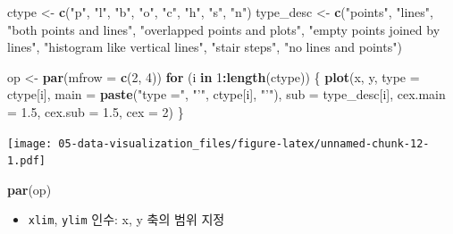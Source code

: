 \documentclass[
  11pt,
]{krantz}
\newenvironment{Shaded}{\begin{snugshade}}{\end{snugshade}}
\newcommand{\ControlFlowTok}[1]{\textcolor[rgb]{0.27,0.27,0.27}{\textbf{#1}}}
\newcommand{\DataTypeTok}[1]{\textcolor[rgb]{0.27,0.27,0.27}{#1}}
\newcommand{\DecValTok}[1]{\textcolor[rgb]{0.06,0.06,0.06}{#1}}
\newcommand{\FloatTok}[1]{\textcolor[rgb]{0.06,0.06,0.06}{#1}}
\newcommand{\KeywordTok}[1]{\textcolor[rgb]{0.27,0.27,0.27}{\textbf{#1}}}
\newcommand{\NormalTok}[1]{#1}
\newcommand{\OperatorTok}[1]{\textcolor[rgb]{0.43,0.43,0.43}{\textbf{#1}}}
\newcommand{\StringTok}[1]{\textcolor[rgb]{0.5,0.5,0.5}{#1}}
\providecommand{\tightlist}{%
  \setlength{\itemsep}{0pt}\setlength{\parskip}{0pt}}
\begin{document}
\begin{Shaded}
\begin{Highlighting}[]
\NormalTok{ctype <-}\StringTok{ }\KeywordTok{c}\NormalTok{(}\StringTok{"p"}\NormalTok{, }\StringTok{"l"}\NormalTok{, }\StringTok{"b"}\NormalTok{, }\StringTok{"o"}\NormalTok{, }\StringTok{"c"}\NormalTok{, }\StringTok{"h"}\NormalTok{, }\StringTok{"s"}\NormalTok{, }\StringTok{"n"}\NormalTok{)}
\NormalTok{type_desc <-}\StringTok{ }\KeywordTok{c}\NormalTok{(}\StringTok{"points"}\NormalTok{, }\StringTok{"lines"}\NormalTok{, }
               \StringTok{"both points and lines"}\NormalTok{, }
               \StringTok{"overlapped points and plots"}\NormalTok{, }
               \StringTok{"empty points joined by lines"}\NormalTok{, }
               \StringTok{"histogram like vertical lines"}\NormalTok{, }
               \StringTok{"stair steps"}\NormalTok{, }
               \StringTok{"no lines and points"}\NormalTok{)}

\NormalTok{op <-}\StringTok{ }\KeywordTok{par}\NormalTok{(}\DataTypeTok{mfrow =} \KeywordTok{c}\NormalTok{(}\DecValTok{2}\NormalTok{, }\DecValTok{4}\NormalTok{))}
\ControlFlowTok{for}\NormalTok{ (i }\ControlFlowTok{in} \DecValTok{1}\OperatorTok{:}\KeywordTok{length}\NormalTok{(ctype)) \{}
  \KeywordTok{plot}\NormalTok{(x, y, }
       \DataTypeTok{type =}\NormalTok{ ctype[i], }
       \DataTypeTok{main =} \KeywordTok{paste}\NormalTok{(}\StringTok{"type ="}\NormalTok{, }\StringTok{"'"}\NormalTok{, ctype[i], }\StringTok{"'"}\NormalTok{),}
       \DataTypeTok{sub =}\NormalTok{ type_desc[i], }
       \DataTypeTok{cex.main =} \FloatTok{1.5}\NormalTok{, }
       \DataTypeTok{cex.sub =} \FloatTok{1.5}\NormalTok{, }
       \DataTypeTok{cex =} \DecValTok{2}\NormalTok{)}
\NormalTok{\}}
\end{Highlighting}
\end{Shaded}

\texttt{[image: 05-data-visualization\_files/figure-latex/unnamed-chunk-12-1.pdf]}

\begin{Shaded}
\begin{Highlighting}[]
\KeywordTok{par}\NormalTok{(op)}
\end{Highlighting}
\end{Shaded}

\normalsize

\begin{itemize}
\tightlist
\item
  \texttt{xlim}, \texttt{ylim} 인수: x, y 축의 범위 지정
\end{itemize}
\end{document}
